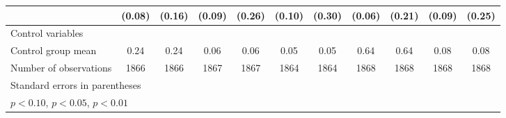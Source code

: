 {\begin{tabular}{l*{10}{c}}
                    &      (0.08)         &      (0.16)         &      (0.09)         &      (0.26)         &      (0.10)         &      (0.30)         &      (0.06)         &      (0.21)         &      (0.09)         &      (0.25)         \\
\hline
Control variables   &                     &                     &                     &                     &                     &                     &                     &                     &                     &                     \\
Control group mean  &        0.24         &        0.24         &        0.06         &        0.06         &        0.05         &        0.05         &        0.64         &        0.64         &        0.08         &        0.08         \\
Number of observations&        1866         &        1866         &        1867         &        1867         &        1864         &        1864         &        1868         &        1868         &        1868         &        1868         \\
\hline\hline
\multicolumn{11}{l}{\footnotesize Standard errors in parentheses}\\
\multicolumn{11}{l}{\footnotesize \sym{*} \(p<0.10\), \sym{**} \(p<0.05\), \sym{***} \(p<0.01\)}\\
\end{tabular}
}
